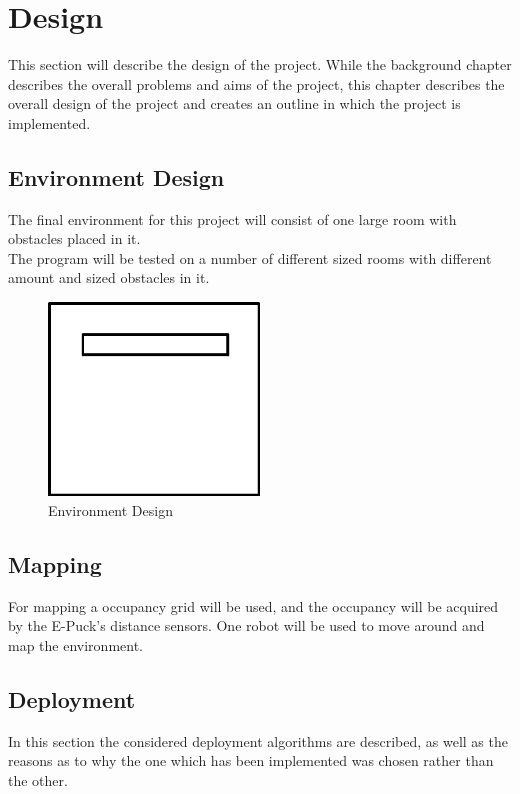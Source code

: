 

\chapter{Design}
\label{Design}

This section will describe the design of the project.
While the background chapter describes the overall problems and aims of the project, this chapter describes the overall design of the project and creates an outline in which the project is implemented.

\section{Environment Design}
The final environment for this project will consist of one large room with obstacles placed in it. \\
The program will be tested on a number of different sized rooms with different amount and sized obstacles in it.

\begin{figure}[h]
\centering
\includegraphics[width=0.5\textwidth]{../../figures/environment_example2.png} 
\caption{Environment Design}
\label{Figure 2}
\end{figure}

\section{Mapping}
For mapping a occupancy grid will be used, and the occupancy will be acquired by the E-Puck's distance sensors. 
One robot will be used to move around and map the environment. 

\section{Deployment}
In this section the considered deployment algorithms are described, as well as the reasons as to why the one which has been implemented was chosen rather than the other. 

